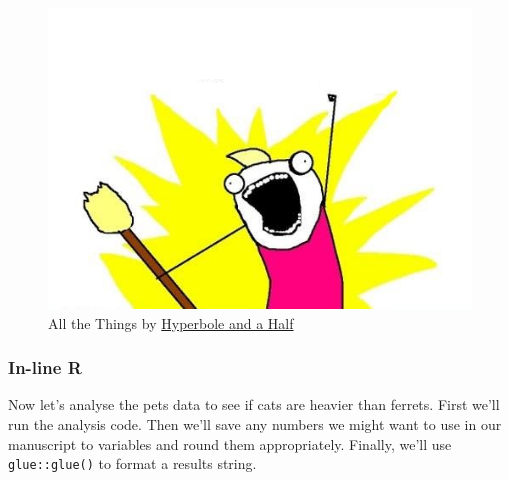 \documentclass[
  oneside]{book}
\begin{document}
\begin{figure}
\centering
\includegraphics{images/memes/x-all-the-things.png}
\caption{All the Things by \href{http://hyperboleandahalf.blogspot.com/}{Hyperbole and a Half}}
\end{figure}

\hypertarget{in-line-r}{%
\subsubsection{In-line R}\label{in-line-r}}

Now let's analyse the pets data to see if cats are heavier than ferrets. First we'll run the analysis code. Then we'll save any numbers we might want to use in our manuscript to variables and round them appropriately. Finally, we'll use \texttt{glue::glue()} to format a results string.
\end{document}
